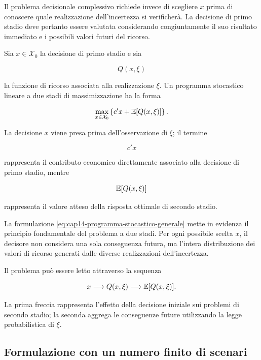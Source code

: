 Il problema decisionale complessivo richiede invece di scegliere $x$ prima
di conoscere quale realizzazione dell'incertezza si verificher\`a. La
decisione di primo stadio deve pertanto essere valutata considerando
congiuntamente il suo risultato immediato e i possibili valori futuri del ricorso.

\begin{definition}
Sia $x\in\mathcal X_0$ la decisione di primo stadio e sia

\[
Q(x,\xi)
\]

\noindent la funzione di ricorso associata alla realizzazione $\xi$. Un programma
stocastico lineare a due stadi di massimizzazione ha la forma

\begin{equation}
\max_{x\in\mathcal X_0}
\left\{
c'x+\mathbb{E}[Q(x,\xi)]
\right\}.
\label{eq:cap14-programma-stocastico-generale}
\end{equation}

La decisione $x$ viene presa prima dell'osservazione di $\xi$; il termine

\[
c'x
\]

\noindent rappresenta il contributo economico direttamente associato alla decisione di
primo stadio, mentre

\[
\mathbb{E}[Q(x,\xi)]
\]

\noindent rappresenta il valore atteso della risposta ottimale di secondo stadio.
\end{definition}

La formulazione
\eqref{eq:cap14-programma-stocastico-generale} mette in evidenza il principio
fondamentale del problema a due stadi. Per ogni possibile scelta $x$, il
decisore non considera una sola conseguenza futura, ma l'intera distribuzione
dei valori di ricorso generati dalle diverse realizzazioni
dell'incertezza.

Il problema pu\`o essere letto attraverso la sequenza

\[
x
\longrightarrow
Q(x,\xi)
\longrightarrow
\mathbb{E}[Q(x,\xi)].
\]

La prima freccia rappresenta l'effetto della decisione iniziale sui problemi
di secondo stadio; la seconda aggrega le conseguenze future utilizzando la
legge probabilistica di $\xi$.

\subsection{Formulazione con un numero finito di scenari}

